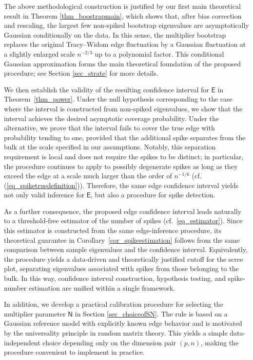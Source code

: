 \documentclass[12pt]{article}
\def\sN{\mathsf N}
\theoremstyle{plain}
\numberwithin{equation}{section}
\begin{document}


The above methodological construction is justified by our first main theoretical result in Theorem \ref{thm_boostrapmain}, which shows that, after bias correction and rescaling, the largest few non-spiked bootstrap eigenvalues are asymptotically Gaussian conditionally on the data. In this sense, the multiplier bootstrap replaces the original Tracy--Widom edge fluctuation by a Gaussian fluctuation at a slightly enlarged scale $n^{-2/3}$ up to a polynomial factor. This conditional Gaussian approximation forms the main theoretical foundation of the proposed procedure; see Section \ref{sec_strate} for more details. 

We then establish the validity of the resulting confidence interval for $\mathsf E$ in Theorem~\ref{thm_power}. Under the null hypothesis corresponding to the case where the interval is constructed from non-spiked eigenvalues, we show that the interval achieves the desired asymptotic coverage probability. Under the alternative, we prove that the interval fails to cover the true edge with probability tending to one, provided that the additional spike separates from the bulk at the scale specified in our assumptions. Notably, this separation requirement is local and does not require the spikes to be distinct; in particular, the procedure continues to apply to possibly degenerate spikes as long as they exceed the edge at a scale much larger than the order of $n^{-1/6}$ (cf. (\ref{eq_spiketruedefinition})). Therefore, the same edge confidence interval yields not only valid inference for $\mathsf E$, but also a  procedure for spike detection.

As a further consequence, the proposed edge confidence interval leads naturally to a threshold-free estimator of the number of spikes (cf.\ \eqref{eq_estimator}). Since this estimator is constructed from the same edge-inference procedure, its theoretical guarantee in Corollary~\ref{cor_spikeestimation} follows from the same comparison between sample eigenvalues and the confidence interval. Equivalently, the procedure yields a data-driven and theoretically justified cutoff for the scree plot, separating eigenvalues associated with spikes from those belonging to the bulk. In this way, confidence interval construction, hypothesis testing, and spike-number estimation are unified within a single framework.

In addition, we develop a practical calibration procedure for selecting the multiplier parameter $\sN$ in Section \ref{sec_choiceofSN}. The rule is based on a Gaussian reference model with explicitly known edge behavior and is motivated by the universality principle in random matrix theory. This yields a simple data-independent choice depending only on the dimension pair $(p,n)$, making the procedure convenient to implement in practice.
\end{document}
